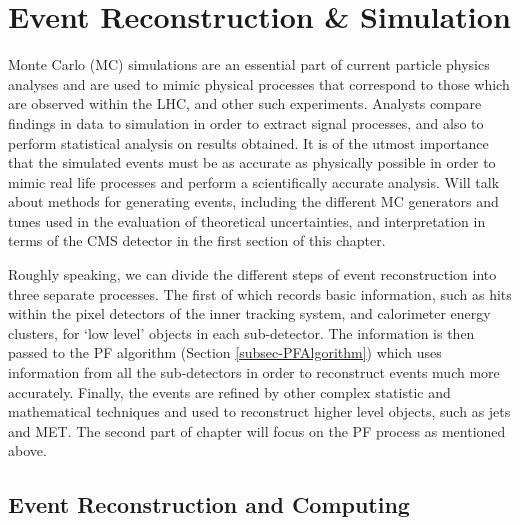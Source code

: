 \chapter{Event Reconstruction \& Simulation} \label{chap-EventReconstruction&Simulation}

Monte Carlo (MC) simulations are an essential part of current particle physics analyses and are used to mimic physical processes that correspond to those which are observed within the LHC, and other such experiments. Analysts compare findings in data to simulation in order to extract signal processes, and also to perform statistical analysis on results obtained. It is of the utmost importance that the simulated events must be as accurate as physically possible in order to mimic real life processes and perform a scientifically accurate analysis. Will talk about methods for generating events, including the different MC generators and tunes used in the evaluation of theoretical uncertainties, and interpretation in terms of the CMS detector in the first section of this chapter.

Roughly speaking, we can divide the different steps of event reconstruction into three separate processes. The first of which records basic information, such as hits within the pixel detectors of the inner tracking system, and calorimeter energy clusters, for `low level' objects in each sub-detector. The information is then passed to the PF algorithm (Section \ref{subsec-PFAlgorithm}) which uses information from all the sub-detectors in order to reconstruct events much more accurately. Finally, the events are refined by other complex statistic and mathematical techniques and used to reconstruct higher level objects, such as jets and MET. The second part of chapter will focus on the PF process \cite{CMS-PAS-PFT-09-001, CMS-PAS-PFT-10-001} as mentioned above.

\section{Event Reconstruction and Computing} \label{sec-EventReconstruction}

